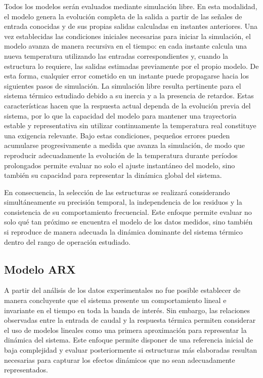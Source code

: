 \documentclass[11pt]{report}
\begin{document}
Todos los modelos serán evaluados mediante simulación libre. En esta modalidad, el modelo genera la evolución completa de la salida a partir de las señales de entrada conocidas y de sus propias salidas calculadas en instantes anteriores. Una vez establecidas las condiciones iniciales necesarias para iniciar la simulación, el modelo avanza de manera recursiva en el tiempo: en cada instante calcula una nueva temperatura utilizando las entradas correspondientes y, cuando la estructura lo requiere, las salidas estimadas previamente por el propio modelo. De esta forma, cualquier error cometido en un instante puede propagarse hacia los siguientes pasos de simulación. La simulación libre resulta pertinente para el sistema térmico estudiado debido a su inercia y a la presencia de retardos. Estas características hacen que la respuesta actual dependa de la evolución previa del sistema, por lo que la capacidad del modelo para mantener una trayectoria estable y representativa sin utilizar continuamente la temperatura real constituye una exigencia relevante. Bajo estas condiciones, pequeños errores pueden acumularse progresivamente a medida que avanza la simulación, de modo que reproducir adecuadamente la evolución de la temperatura durante períodos prolongados permite evaluar no solo el ajuste instantáneo del modelo, sino también su capacidad para representar la dinámica global del sistema.

En consecuencia, la selección de las estructuras se realizará considerando simultáneamente su precisión temporal, la independencia de los residuos y la consistencia de su comportamiento frecuencial. Este enfoque permite evaluar no solo qué tan próximo se encuentra el modelo de los datos medidos, sino también si reproduce de manera adecuada la dinámica dominante del sistema térmico dentro del rango de operación estudiado.



\subsection{Modelo ARX}

A partir del análisis de los datos experimentales no fue posible establecer de manera concluyente que el sistema presente un comportamiento lineal e invariante en el tiempo en toda la banda de interés. Sin embargo, las relaciones observadas entre la entrada de caudal y la respuesta térmica permiten considerar el uso de modelos lineales como una primera aproximación para representar la dinámica del sistema. Este enfoque permite disponer de una referencia inicial de baja complejidad y evaluar posteriormente si estructuras más elaboradas resultan necesarias para capturar los efectos dinámicos que no sean adecuadamente representados.
\end{document}
